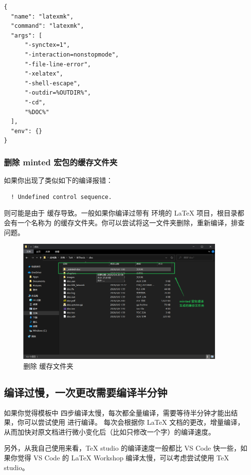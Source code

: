 \begin{verbatim}
{
  "name": "latexmk",
  "command": "latexmk",
  "args": [
      "-synctex=1",
      "-interaction=nonstopmode",
      "-file-line-error",
      "-xelatex",
      "-shell-escape",
      "-outdir=%OUTDIR%",
      "-cd",
      "%DOC%"
  ],
  "env": {}
}
\end{verbatim}

\subsubsection{删除 minted 宏包的缓存文件夹}

如果你出现了类似如下的编译报错：
\begin{verbatim}
  ! Undefined control sequence.
\end{verbatim}

则可能是由于  缓存导致。一般如果你编译过带有  环境的 LaTeX 项目，根目录都会有一个名称为  的缓存文件夹。你可以尝试将这一文件夹删除，重新编译，排查问题。

\begin{figure}[H]
  \flushright
  \includegraphics[width=0.93\textwidth]{images/delete_minted_doc.png}
  \caption{删除  缓存文件夹}
  \label{delete_minted_doc}
\end{figure}

\subsection{编译过慢，一次更改需要编译半分钟}

如果你觉得模板中  四步编译太慢，每次都全量编译，需要等待半分钟才能出结果，你可以尝试使用  进行编译。 每次会根据你 LaTeX 文档的更改，增量编译，从而加快对原文档进行微小变化后（比如只修改一个字）的编译速度。

另外，从我自己使用来看，TeX studio 的编译速度一般都比 VS Code 快一些，如果你觉得 VS Code 的 LaTeX Workshop 编译太慢，可以考虑尝试使用 TeX studio。
